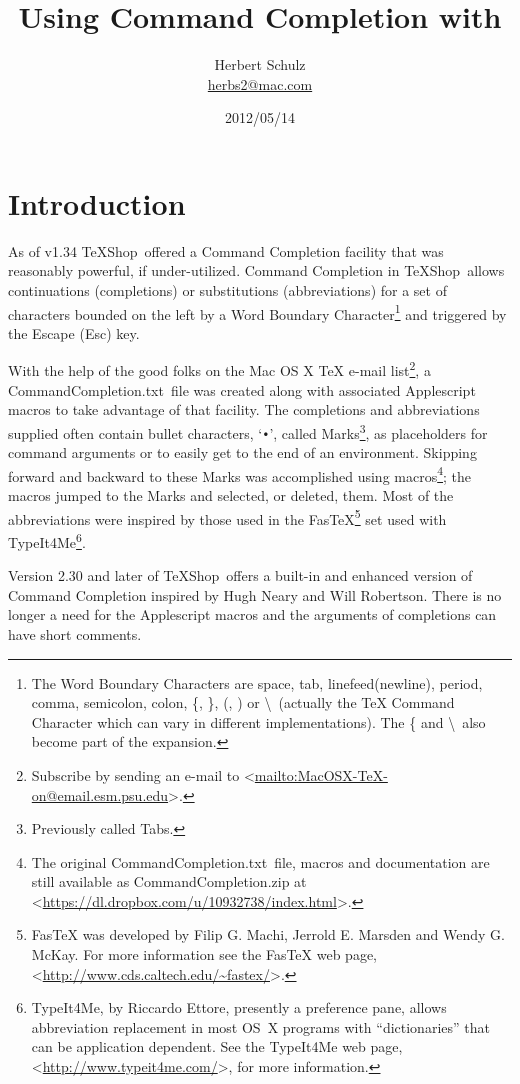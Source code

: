 \documentclass[11pt]{article}
\title{Using Command Completion with \\ \TS}
\author{Herbert Schulz\\\small\href{mailto:herbs2@mac.com}{herbs2@mac.com}}
\date{2012/05/14}
\newcommand{\esckey}{\textsf{Esc}}
\newcommand{\fastex}{Fas\hspace{-.15em}\TeX}
\newcommand{\TS}{\textsf{\TeX Shop}}
\newcommand{\CCT}{\textsf{CommandCompletion.txt}}
\begin{document}
\maketitle
\thispagestyle{empty}

\section*{Introduction}

As of v1.34 \TS\ offered a Command Completion facility that was reasonably powerful, if under-utilized. Command Completion in \TS\ allows continuations (completions) or substitutions (abbreviations) for a set of characters bounded on the left by a \textsf{Word Boundary Character}\footnote{The \textsf{Word Boundary Characters} are space, tab, linefeed(newline), period, comma, semicolon, colon, \{, \}, (, ) or \textbackslash\ (actually the \textsf{TeX Command Character} which can vary in different implementations). The \{ and \textbackslash\ also become part of the expansion.} and triggered by the Escape (\esckey) key.

With the help of the good folks on the \textsf{Mac OS X TeX} e-mail list\footnote{Subscribe by sending an e-mail to <\url{mailto:MacOSX-TeX-on@email.esm.psu.edu}>.}, a \CCT\ file was created along with associated Applescript macros to take advantage of that facility. The completions and abbreviations supplied often contain bullet characters, `\texttt{•}', called Marks\footnote{Previously called Tabs.}, as placeholders for command arguments or to easily get to the end of an environment. Skipping forward and backward to these Marks was accomplished using macros\footnote{The original \CCT\ file, macros and documentation are still available as \textsf{CommandCompletion.zip} at <\url{https://dl.dropbox.com/u/10932738/index.html}>.}; the macros jumped to the Marks and selected, or deleted, them. Most of the abbreviations were inspired by those used in the \textsf{\fastex}\footnote{\textsf{\fastex} was developed by Filip G. Machi, Jerrold E. Marsden and Wendy G. McKay. For more information see the \textsf{\fastex} web page, <\url{http://www.cds.caltech.edu/~fastex/}>.} set used with \textsf{TypeIt4Me}\footnote{\textsf{TypeIt4Me}, by Riccardo Ettore, presently a preference pane, allows abbreviation replacement in most OS~X programs with ``dictionaries'' that can be application dependent. See the \textsf{TypeIt4Me} web page, <\url{http://www.typeit4me.com/}>, for more information.}.

Version 2.30 and later of \TS\ offers a built-in and enhanced version of Command Completion inspired by Hugh Neary and Will Robertson. There is no longer a need for the Applescript macros and the arguments of completions can have short comments.
\end{document}
